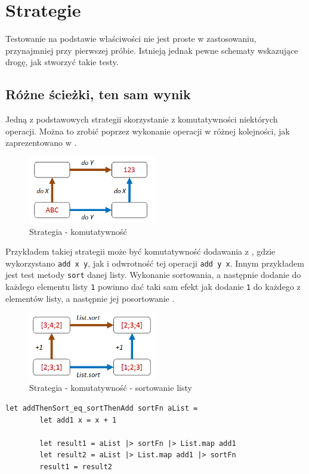 \section{Strategie}

Testowanie na podstawie właściwości nie jest proste w zastosowaniu, przynajmniej przy pierwszej próbie.
Istnieją jednak pewne schematy wskazujące drogę, jak stworzyć takie testy.
\subsection{Różne ścieżki, ten sam wynik}

Jedną z podstawowych strategii skorzystanie z komutatywności niektórych operacji. Można to zrobić poprzez wykonanie operacji w różnej kolejności, jak zaprezentowano w .
\begin{figure}[h]
    \centering
    \includegraphics[width=0.5\textwidth]{images/property_commutative.png}
    \caption{Strategia - komutatywność}
    \label{fig:commutative_strategy}
\end{figure}

Przykładem takiej strategii może być komutatywność dodawania z , gdzie wykorzystano \texttt{add x y}, jak i odwrotność tej operacji \texttt{add y x}. 
Innym przykładem jest test metody \texttt{sort} danej listy. 
Wykonanie sortowania, a następnie dodanie do każdego elementu listy \texttt{1} powinno dać taki sam efekt jak dodanie \texttt{1} do każdego z elementów listy, a następnie jej posortowanie  .

\begin{figure}
    \centering
    \includegraphics[width=0.5\textwidth]{images/property_list_sort1.png}
    \caption{Strategia - komutatywność - sortowanie listy}
    \label{fig:commutative_strategy_list_sort}
\end{figure}
\lstset{language=FSharp, basicstyle=\scriptsize}
\begin{lstlisting}[frame=single,caption={Test sortowania listy z wykorzystaniem strategii komutatywnej},label=kod:list_sort_add1]
    let addThenSort_eq_sortThenAdd sortFn aList =
        let add1 x = x + 1

        let result1 = aList |> sortFn |> List.map add1
        let result2 = aList |> List.map add1 |> sortFn
        result1 = result2
\end{lstlisting}

